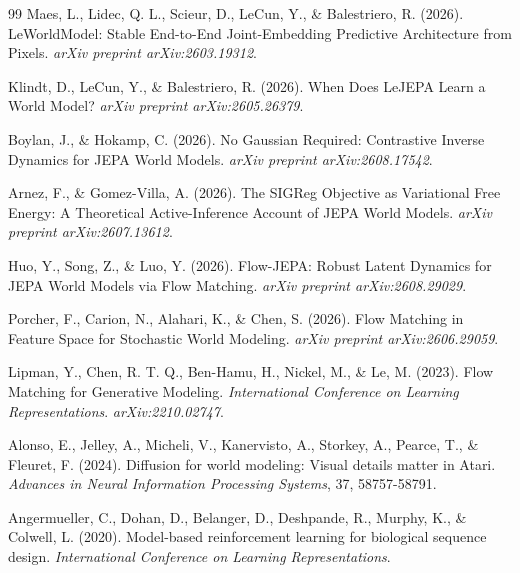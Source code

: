 \documentclass[12pt, a4paper]{article}
\begin{document}
\begin{thebibliography}{99}
Maes, L., Lidec, Q. L., Scieur, D., LeCun, Y., \& Balestriero, R. (2026). \newblock LeWorldModel: Stable End-to-End Joint-Embedding Predictive Architecture from Pixels. \newblock \textit{arXiv preprint arXiv:2603.19312}.


Klindt, D., LeCun, Y., \& Balestriero, R. (2026). \newblock When Does LeJEPA Learn a World Model? \newblock \textit{arXiv preprint arXiv:2605.26379}.


Boylan, J., \& Hokamp, C. (2026). \newblock No Gaussian Required: Contrastive Inverse Dynamics for JEPA World Models. \newblock \textit{arXiv preprint arXiv:2608.17542}.


Arnez, F., \& Gomez-Villa, A. (2026). \newblock The SIGReg Objective as Variational Free Energy: A Theoretical Active-Inference Account of JEPA World Models. \newblock \textit{arXiv preprint arXiv:2607.13612}.


Huo, Y., Song, Z., \& Luo, Y. (2026). \newblock Flow-JEPA: Robust Latent Dynamics for JEPA World Models via Flow Matching. \newblock \textit{arXiv preprint arXiv:2608.29029}.


Porcher, F., Carion, N., Alahari, K., \& Chen, S. (2026). \newblock Flow Matching in Feature Space for Stochastic World Modeling. \newblock \textit{arXiv preprint arXiv:2606.29059}.


Lipman, Y., Chen, R. T. Q., Ben-Hamu, H., Nickel, M., \& Le, M. (2023). \newblock Flow Matching for Generative Modeling. \newblock \textit{International Conference on Learning Representations}. \textit{arXiv:2210.02747}.


Alonso, E., Jelley, A., Micheli, V., Kanervisto, A., Storkey, A., Pearce, T., \& Fleuret, F. (2024). \newblock Diffusion for world modeling: Visual details matter in Atari. \newblock \textit{Advances in Neural Information Processing Systems}, 37, 58757-58791.


Angermueller, C., Dohan, D., Belanger, D., Deshpande, R., Murphy, K., \& Colwell, L. (2020). \newblock Model-based reinforcement learning for biological sequence design. \newblock \textit{International Conference on Learning Representations}.



\end{thebibliography}
\end{document}
